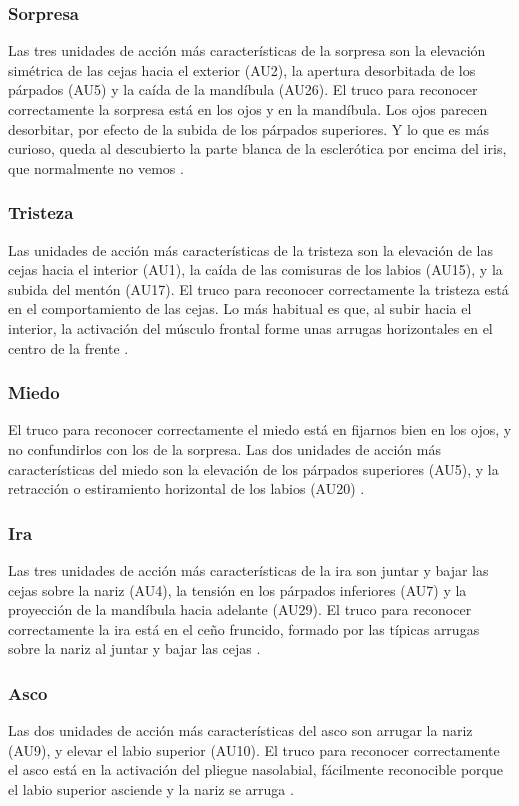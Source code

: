 \subsubsection*{Sorpresa}
Las tres unidades de acción más características de la sorpresa son la elevación simétrica de las cejas hacia el exterior (AU2), la apertura desorbitada de los párpados (AU5) y la caída de la mandíbula (AU26). El truco para reconocer correctamente la sorpresa está en los ojos y en la mandíbula. Los ojos parecen desorbitar, por efecto de la subida de los párpados superiores. Y lo que es más curioso, queda al descubierto la parte blanca de la esclerótica por encima del iris, que normalmente no vemos \cite{ReconocerLasEmociones}.

\subsubsection*{Tristeza}
Las unidades de acción más características de la tristeza son la elevación de las cejas hacia el interior (AU1), la caída de las comisuras de los labios (AU15), y la subida del mentón (AU17). El truco para reconocer correctamente la tristeza está en el comportamiento de las cejas. Lo más habitual es que, al subir hacia el interior, la activación del músculo frontal forme unas arrugas horizontales en el centro de la frente \cite{ReconocerLasEmociones}.

\subsubsection*{Miedo}
El truco para reconocer correctamente el miedo está en fijarnos bien en los ojos, y no confundirlos con los de la sorpresa. Las dos unidades de acción más características del miedo son la elevación de los párpados superiores (AU5), y la retracción o estiramiento horizontal de los labios (AU20) \cite{ReconocerLasEmociones}.

\subsubsection*{Ira}
Las tres unidades de acción más características de la ira son juntar y bajar las cejas sobre la nariz (AU4), la tensión en los párpados inferiores (AU7) y la proyección de la mandíbula hacia adelante (AU29). El truco para reconocer correctamente la ira está en el ceño fruncido, formado por las típicas arrugas sobre la nariz al juntar y bajar las cejas \cite{ReconocerLasEmociones}.

\subsubsection*{Asco}
Las dos unidades de acción más características del asco son arrugar la nariz (AU9), y elevar el labio superior (AU10). El truco para reconocer correctamente el asco está en la activación del pliegue nasolabial, fácilmente reconocible porque el labio superior asciende y la nariz se arruga \cite{ReconocerLasEmociones}.

